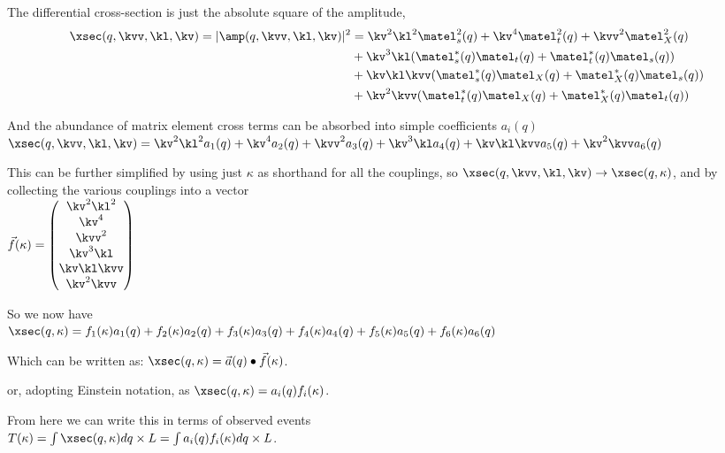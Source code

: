     The differential cross-section is just the absolute square of the amplitude,\\
    \begin{equation}\begin{split}
        \xsec(q,\kvv,\kl,\kv) = |\amp(q,\kvv,\kl,\kv)|^2 &= 
          \kv^2 \kl^2 \matel_s^2(q) + \kv^4 \matel_t^2(q) + \kvv^2 \matel_X^2(q) \\
        &+ \kv^3 \kl (\matel_s^*(q) \matel_t(q) + \matel_t^*(q) \matel_s(q)) \\
        &+ \kv \kl \kvv (\matel_s^*(q) \matel_X(q) + \matel_X^*(q) \matel_s(q) ) \\
        &+ \kv^2 \kvv (\matel_t^*(q) \matel_X(q) + \matel_X^*(q) \matel_t(q) )
    \end{split} \end{equation}

    And the abundance of matrix element cross terms can be absorbed into simple coefficients $a_i(q)$\\
    $\xsec(q,\kvv,\kl,\kv) = \kv^2 \kl^2 a_1(q) + \kv^4 a_2(q) + \kvv^2 a_3(q) + \kv^3 \kl a_4(q) + \kv \kl \kvv a_5(q) + \kv^2 \kvv a_6(q) $


    This can be further simplified by using just $\kappa$ as shorthand for all the couplings,
    so  $\xsec(q,\kvv,\kl,\kv) \to  \xsec(q,\kappa) $, and by collecting the various couplings into a vector\\
    $ \vec{f}(\kappa) = \begin{pmatrix} \kv^2 \kl^2 \\ \kv^4 \\ \kvv^2 \\ \kv^3 \kl \\ \kv \kl \kvv \\ \kv^2 \kvv \end{pmatrix} $

    So we now have\\
    $\xsec(q,\kappa) = f_1(\kappa) a_1(q) + f_2(\kappa) a_2(q) + f_3(\kappa) a_3(q) + f_4(\kappa) a_4(q) + f_5(\kappa) a_5(q) + f_6(\kappa) a_6(q) $

    Which can be written as:  
    $\xsec(q,\kappa) = \vec{a}(q) \bullet \vec{f}(\kappa) $.

    or, adopting Einstein notation, as
    $\xsec(q,\kappa) = a_i(q) f_i(\kappa) $.

    From here we can write this in terms of observed events\\ 
    $T(\kappa) = \int \xsec(q,\kappa) dq \times L = \int a_i(q) f_i(\kappa) dq \times L $.

